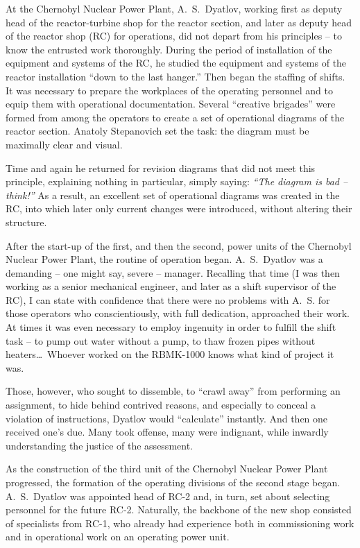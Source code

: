\documentclass[openright]{bookest}
\begin{document}
At the Chernobyl Nuclear Power Plant, A.~S.~Dyatlov, working first as deputy head of the reactor-turbine shop for the reactor section, and later as deputy head of the reactor shop (RC) for operations, did not depart from his principles -- to know the entrusted work thoroughly. During the period of installation of the equipment and systems of the RC, he studied the equipment and systems of the reactor installation ``down to the last hanger.'' Then began the staffing of shifts. It was necessary to prepare the workplaces of the operating personnel and to equip them with operational documentation. Several ``creative brigades'' were formed from among the operators to create a set of operational diagrams of the reactor section. Anatoly Stepanovich set the task: the diagram must be maximally clear and visual.

Time and again he returned for revision diagrams that did not meet this principle, explaining nothing in particular, simply saying: \textit{``The diagram is bad -- think!''} As a result, an excellent set of operational diagrams was created in the RC, into which later only current changes were introduced, without altering their structure.

After the start-up of the first, and then the second, power units of the Chernobyl Nuclear Power Plant, the routine of operation began. A.~S.~Dyatlov was a demanding -- one might say, severe -- manager. Recalling that time (I was then working as a senior mechanical engineer, and later as a shift supervisor of the RC), I can state with confidence that there were no problems with A.~S. for those operators who conscientiously, with full dedication, approached their work. At times it was even necessary to employ ingenuity in order to fulfill the shift task -- to pump out water without a pump, to thaw frozen pipes without heaters\ldots~Whoever worked on the RBMK-1000 knows what kind of project it was.

Those, however, who sought to dissemble, to ``crawl away'' from performing an assignment, to hide behind contrived reasons, and especially to conceal a violation of instructions, Dyatlov would ``calculate'' instantly. And then one received one's due. Many took offense, many were indignant, while inwardly understanding the justice of the assessment.

As the construction of the third unit of the Chernobyl Nuclear Power Plant progressed, the formation of the operating divisions of the second stage began. A.~S.~Dyatlov was appointed head of RC-2 and, in turn, set about selecting personnel for the future RC-2. Naturally, the backbone of the new shop consisted of specialists from RC-1, who already had experience both in commissioning work and in operational work on an operating power unit.
\end{document}
